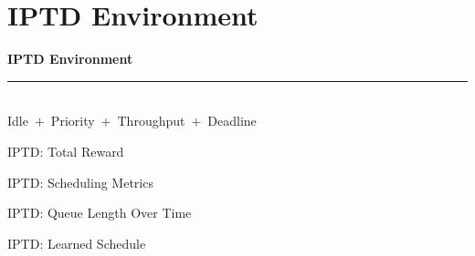 
\section{IPTD Environment}

\begin{frame}[plain]
  \vfill
  \begin{center}
    {\Huge\bfseries\color{DeepBlue} IPTD Environment}\\[0.6em]
    {\color{SkyBlue}\rule{0.40\linewidth}{1.4pt}}\\[0.7em]
    {\large\color{DeepBlue!80!black} Idle \,$+$\, Priority \,$+$\, Throughput \,$+$\, Deadline}
  \end{center}
  \vfill
\end{frame}

\begin{frame}{IPTD: Total Reward}
  \centering
\end{frame}

\begin{frame}{IPTD: Scheduling Metrics}
  \centering
\end{frame}

\begin{frame}{IPTD: Queue Length Over Time}
  \centering
\end{frame}

\begin{frame}{IPTD: Learned Schedule}
  \centering

\end{frame}
